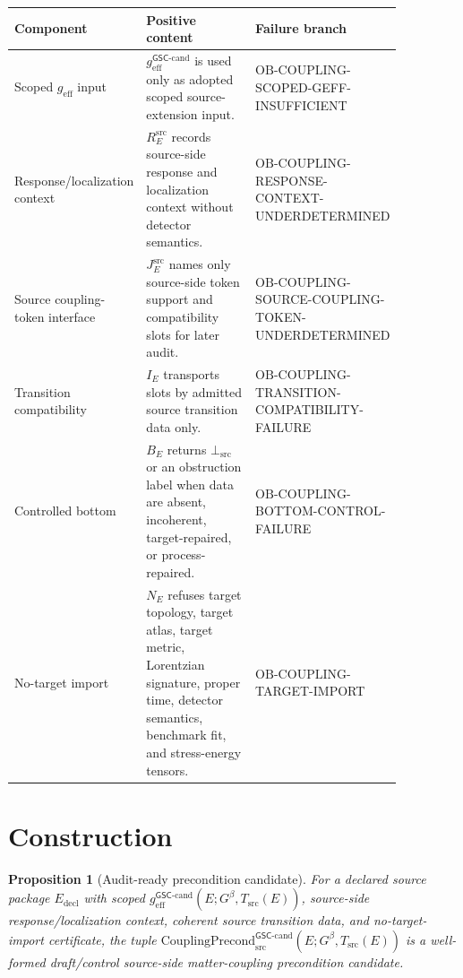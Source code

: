 \documentclass[11pt]{article}
\newcommand{\Gbeta}{G^\beta}
\newcommand{\geff}{g_{\mathrm{eff}}}
\newcommand{\geffCand}{g_{\mathrm{eff}}^{\mathsf{GSC}\mbox{-}\mathrm{cand}}}
\newcommand{\CouplingPrecond}{\mathrm{CouplingPrecond}^{\mathsf{GSC}\mbox{-}\mathrm{cand}}_{\mathrm{src}}}
\newcommand{\BottomSrc}{\bot_{\mathrm{src}}}
\newcommand{\OB}{\mathrm{OB}\mbox{-}\mathrm{COUPLING}}
\newtheorem{proposition}{Proposition}
\begin{document}
\begin{longtable}{p{0.24\linewidth}p{0.34\linewidth}p{0.28\linewidth}}
\toprule
Component & Positive content & Failure branch \\
\midrule
Scoped \(\geff\) input & \(\geffCand\) is used only as adopted scoped
source-extension input. & \(\OB\)-SCOPED-GEFF-INSUFFICIENT \\
Response/localization context & \(R^{\mathrm{src}}_E\) records source-side
response and localization context without detector semantics. &
\(\OB\)-RESPONSE-CONTEXT-UNDERDETERMINED \\
Source coupling-token interface & \(J^{\mathrm{src}}_E\) names only
source-side token support and compatibility slots for later audit. &
\(\OB\)-SOURCE-COUPLING-TOKEN-UNDERDETERMINED \\
Transition compatibility & \(I_E\) transports slots by admitted source
transition data only. & \(\OB\)-TRANSITION-COMPATIBILITY-FAILURE \\
Controlled bottom & \(B_E\) returns \(\BottomSrc\) or an obstruction label when
data are absent, incoherent, target-repaired, or process-repaired. &
\(\OB\)-BOTTOM-CONTROL-FAILURE \\
No-target import & \(N_E\) refuses target topology, target atlas, target
metric, Lorentzian signature, proper time, detector semantics, benchmark fit,
and stress-energy tensors. & \(\OB\)-TARGET-IMPORT \\
\bottomrule
\end{longtable}

\section{Construction}

\begin{proposition}[Audit-ready precondition candidate]
For a declared source package \(E_{\mathrm{decl}}\) with scoped
\(\geffCand(E;\Gbeta,T_{\mathrm{src}}(E))\), source-side response/localization
context, coherent source transition data, and no-target-import certificate,
the tuple \(\CouplingPrecond(E;\Gbeta,T_{\mathrm{src}}(E))\) is a well-formed
draft/control source-side matter-coupling precondition candidate.
\end{proposition}
\end{document}
